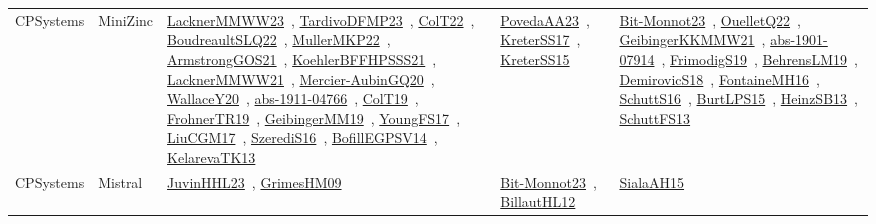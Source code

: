{\begin{longtable}{lp{3cm}>{\raggedright\arraybackslash}p{6cm}>{\raggedright\arraybackslash}p{6cm}>{\raggedright\arraybackslash}p{8cm}}
CPSystems & MiniZinc & \href{articles/LacknerMMWW23.pdf}{LacknerMMWW23}~\cite{LacknerMMWW23}, \href{papers/TardivoDFMP23.pdf}{TardivoDFMP23}~\cite{TardivoDFMP23}, \href{articles/ColT22.pdf}{ColT22}~\cite{ColT22}, \href{papers/BoudreaultSLQ22.pdf}{BoudreaultSLQ22}~\cite{BoudreaultSLQ22}, \href{articles/MullerMKP22.pdf}{MullerMKP22}~\cite{MullerMKP22}, \href{papers/ArmstrongGOS21.pdf}{ArmstrongGOS21}~\cite{ArmstrongGOS21}, \href{articles/KoehlerBFFHPSSS21.pdf}{KoehlerBFFHPSSS21}~\cite{KoehlerBFFHPSSS21}, \href{papers/LacknerMMWW21.pdf}{LacknerMMWW21}~\cite{LacknerMMWW21}, \href{papers/Mercier-AubinGQ20.pdf}{Mercier-AubinGQ20}~\cite{Mercier-AubinGQ20}, \href{articles/WallaceY20.pdf}{WallaceY20}~\cite{WallaceY20}, \href{articles/abs-1911-04766.pdf}{abs-1911-04766}~\cite{abs-1911-04766}, \href{papers/ColT19.pdf}{ColT19}~\cite{ColT19}, \href{papers/FrohnerTR19.pdf}{FrohnerTR19}~\cite{FrohnerTR19}, \href{papers/GeibingerMM19.pdf}{GeibingerMM19}~\cite{GeibingerMM19}, \href{papers/YoungFS17.pdf}{YoungFS17}~\cite{YoungFS17}, \href{papers/LiuCGM17.pdf}{LiuCGM17}~\cite{LiuCGM17}, \href{papers/SzerediS16.pdf}{SzerediS16}~\cite{SzerediS16}, \href{papers/BofillEGPSV14.pdf}{BofillEGPSV14}~\cite{BofillEGPSV14}, \href{papers/KelarevaTK13.pdf}{KelarevaTK13}~\cite{KelarevaTK13} & \href{papers/PovedaAA23.pdf}{PovedaAA23}~\cite{PovedaAA23}, \href{articles/KreterSS17.pdf}{KreterSS17}~\cite{KreterSS17}, \href{papers/KreterSS15.pdf}{KreterSS15}~\cite{KreterSS15} & \href{papers/Bit-Monnot23.pdf}{Bit-Monnot23}~\cite{Bit-Monnot23}, \href{papers/OuelletQ22.pdf}{OuelletQ22}~\cite{OuelletQ22}, \href{papers/GeibingerKKMMW21.pdf}{GeibingerKKMMW21}~\cite{GeibingerKKMMW21}, \href{articles/abs-1901-07914.pdf}{abs-1901-07914}~\cite{abs-1901-07914}, \href{papers/FrimodigS19.pdf}{FrimodigS19}~\cite{FrimodigS19}, \href{papers/BehrensLM19.pdf}{BehrensLM19}~\cite{BehrensLM19}, \href{papers/DemirovicS18.pdf}{DemirovicS18}~\cite{DemirovicS18}, \href{papers/FontaineMH16.pdf}{FontaineMH16}~\cite{FontaineMH16}, \href{papers/SchuttS16.pdf}{SchuttS16}~\cite{SchuttS16}, \href{papers/BurtLPS15.pdf}{BurtLPS15}~\cite{BurtLPS15}, \href{articles/HeinzSB13.pdf}{HeinzSB13}~\cite{HeinzSB13}, \href{papers/SchuttFS13.pdf}{SchuttFS13}~\cite{SchuttFS13}\\
CPSystems & Mistral & \href{papers/JuvinHHL23.pdf}{JuvinHHL23}~\cite{JuvinHHL23}, \href{papers/GrimesHM09.pdf}{GrimesHM09}~\cite{GrimesHM09} & \href{papers/Bit-Monnot23.pdf}{Bit-Monnot23}~\cite{Bit-Monnot23}, \href{papers/BillautHL12.pdf}{BillautHL12}~\cite{BillautHL12} & \href{papers/SialaAH15.pdf}{SialaAH15}~\cite{SialaAH15}\\

\end{longtable}}
